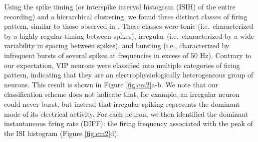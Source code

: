 Using the spike timing (or interspike interval histogram (ISIH) of the entire recording) and a hierarchical clustering, we found three distinct classes of firing pattern, similar to those observed in \cite{Pennartz1998}.
These classes were tonic (i.e.\ characterized by a highly regular timing between spikes), irregular (i.e.\ characterized by a wide variability in spacing between spikes), and bursting (i.e., characterized by infrequent bursts of several spikes at frequencies in excess of 50 Hz).
Contrary to our expectation, VIP neurons were classified into multiple categories of firing pattern, indicating that they are an electrophysiologically heterogeneous group of neurons.
This result is shown in Figure \ref{fig:cm2}a-b.
We note that our classification scheme does not indicate that, for example, an irregular neuron could never burst, but instead that irregular spiking represents the dominant mode of its electrical activity.
For each neuron, we then identified the dominant instantaneous firing rate (DIFF): the firing frequency associated with the peak of the ISI histogram (Figure \ref{fig:cm2}d).

